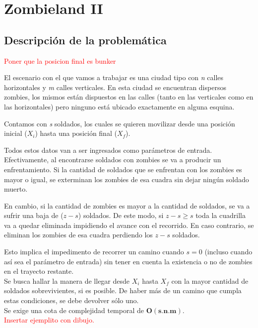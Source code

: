 \section{Zombieland II}
\subsection{Descripci\'on de la problem\'atica}

\textcolor{red}{Poner que la posicion final es bunker}

El escenario con el que vamos a trabajar es una ciudad tipo con \emph{n} calles horizontales y \emph{m} calles verticales. En esta ciudad se encuentran dispersos zombies, los mismos est\'an dispuestos en las calles (tanto en las verticales como en las horizontales) pero ninguno est\'a ubicado exactamente en alguna esquina. 

Contamos con \emph{s} soldados, los cuales se quieren movilizar desde una posici\'on inicial ($X_i$) hasta una posici\'on final ($X_f$).

Todos estos datos van a ser ingresados como par\'ametros de entrada.\\

Efectivamente, al encontrarse soldados con zombies se va a producir un enfrentamiento. Si la cantidad de soldados que se enfrentan con los zombies es mayor o igual, se exterminan los zombies de esa cuadra sin dejar ning\'un soldado muerto. 

En cambio, si la cantidad de zombies es mayor a la cantidad de soldados, se va a sufrir una baja de ($z-s$) soldados. De este modo, si $z-s\geq s$ toda la cuadrilla va a quedar eliminada impidiendo el avance con el recorrido. En caso contrario, se eliminan los zombies de esa cuadra perdiendo los $z-s$ soldados.

Esto implica el impedimento de recorrer un camino cuando $s=0$ (incluso cuando as\'i sea el par\'ametro de entrada) sin tener en cuenta la existencia o no de zombies en el trayecto restante.\\

Se busca hallar la manera de llegar desde $X_i$ hasta $X_f$ con la mayor cantidad de soldados sobrevivientes, si es posible. De haber m\'as de un camino que cumpla estas condiciones, se debe devolver s\'olo uno.\\

Se exige una cota de complejidad temporal de $\mathbf{O(s.n.m)}$.\\

\textcolor{red}{Insertar ejemplito con dibujo.}

